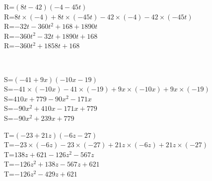 \documentclass{article}%
\begin{document}
\begin{minipage}{0.5\textwidth}%
R=$(8t-42)(-4-45t)$\\%
R=$8t \times (-4)+8t \times (-45t)-42 \times (-4)-42 \times (-45t)$\\%
R=$-32t-360t^2+168+1890t$\\%
R=$-360t^2-32t+1890t+168$\\%
R=$-360t^2+1858t+168$\\%
\end{minipage}%
\\%
\begin{minipage}{0.5\textwidth}%
S=$(-41+9x)(-10x-19)$\\%
S=$-41 \times (-10x)-41 \times (-19)+9x \times (-10x)+9x \times (-19)$\\%
S=$410x+779-90x^2-171x$\\%
S=$-90x^2+410x-171x+779$\\%
S=$-90x^2+239x+779$\\%
\end{minipage}%
\begin{minipage}{0.5\textwidth}%
T=$(-23+21z)(-6z-27)$\\%
T=$-23 \times (-6z)-23 \times (-27)+21z \times (-6z)+21z \times (-27)$\\%
T=$138z+621-126z^2-567z$\\%
T=$-126z^2+138z-567z+621$\\%
T=$-126z^2-429z+621$\\%
\end{minipage}%
\\

%
\end{document}
